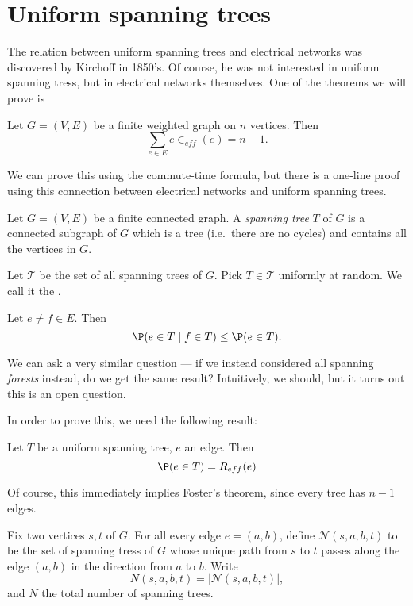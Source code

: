 \documentclass[a4paper]{article}
\begin{document}
\section{Uniform spanning trees}
The relation between uniform spanning trees and electrical networks was discovered by Kirchoff in 1850's. Of course, he was not interested in uniform spanning tress, but in electrical networks themselves. One of the theorems we will prove is
\begin{thm}
  Let $G = (V, E)$ be a finite weighted graph on $n$ vertices. Then
  \[
    \sum_{e \in E}e \in _{eff}(e) = n - 1.
  \]
\end{thm}
We can prove this using the commute-time formula, but there is a one-line proof using this connection between electrical networks and uniform spanning trees.
\begin{defi}
  Let $G = (V, E)$ be a finite connected graph. A \emph{spanning tree} $T$ of $G$ is a connected subgraph of $G$ which is a tree (i.e.\ there are no cycles) and contains all the vertices in $G$.
\end{defi}

Let $\mathcal{T}$ be the set of all spanning trees of $G$. Pick $T \in \mathcal{T}$ uniformly at random. We call it the .
\begin{thm}
  Let $e \not= f \in E$. Then
  \[
    \P(e \in T \mid f \in T) \leq \P(e \in T).
  \]
\end{thm}
We can ask a very similar question --- if we instead considered all spanning \emph{forests} instead, do we get the same result? Intuitively, we should, but it turns out this is an open question.

In order to prove this, we need the following result:
\begin{thm}[Kirchoff]
  Let $T$ be a uniform spanning tree, $e$ an edge. Then
  \[
    \P(e \in T) = R_{eff}(e)
  \]
\end{thm}
Of course, this immediately implies Foster's theorem, since every tree has $n - 1$ edges.

\begin{notation}
  Fix two vertices $s, t$ of $G$. For all every edge $e = (a, b)$, define $\mathcal{N}(s, a, b, t)$ to be the set of spanning tress of $G$ whose unique path from $s$ to $t$ passes along the edge $(a, b)$ in the direction from $a$ to $b$. Write
  \[
    N(s, a, b, t) = |\mathcal{N}(s, a, b, t)|,
  \]
  and $N$ the total number of spanning trees.
\end{notation}
\end{document}
